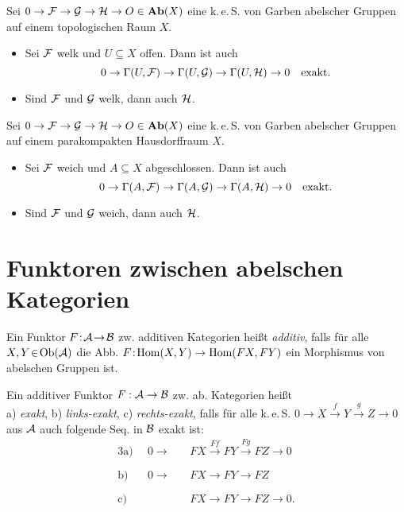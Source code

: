\documentclass{cheat-sheet}
\newcommand{\keS}{k.\,e.\,S.} %
\begin{document}
\begin{lem}
  Sei $0 \to \mathcal{F} \to \mathcal{G} \to \mathcal{H} \to O \in \mathbf{Ab}(X)$ eine \keS{} von Garben abelscher Gruppen auf einem topologischen Raum $X$.
  \begin{itemize}
    \item Sei $\mathcal{F}$ welk und $U \subseteq X$ offen. Dann ist auch
    \[
      0 \to \Gamma(U, \mathcal{F}) \to \Gamma(U, \mathcal{G}) \to \Gamma(U, \mathcal{H}) \to 0
      \quad \text{exakt.}
    \]
    \item Sind $\mathcal{F}$ und $\mathcal{G}$ welk, dann auch $\mathcal{H}$.
  \end{itemize}
\end{lem}

\begin{lem}
  Sei $0 \to \mathcal{F} \to \mathcal{G} \to \mathcal{H} \to O \in \mathbf{Ab}(X)$ eine \keS{} von Garben abelscher Gruppen auf einem parakompakten Hausdorffraum $X$.
  \begin{itemize}
    \item Sei $\mathcal{F}$ weich und $A \subseteq X$ abgeschlossen. Dann ist auch
    \[
      0 \to \Gamma(A, \mathcal{F}) \to \Gamma(A, \mathcal{G}) \to \Gamma(A, \mathcal{H}) \to 0
      \quad \text{exakt.}
    \]
    \item Sind $\mathcal{F}$ und $\mathcal{G}$ weich, dann auch $\mathcal{H}$.
  \end{itemize}
\end{lem}

\section{Funktoren zwischen abelschen Kategorien}

\begin{defn}
  Ein Funktor $F \!:\! \mathcal{A} \!\to\! \mathcal{B}$ zw. additiven Kategorien heißt \emph{additiv}, falls für alle $X, Y \!\in\! \operatorname{Ob}(\mathcal{A})$ die Abb. $F \!:\! \operatorname{Hom}(X, Y) \to \operatorname{Hom}(FX, FY)$ ein Morphismus von abelschen Gruppen ist.
\end{defn}


\begin{defn}
  Ein additiver Funktor $F : \mathcal{A} \to \mathcal{B}$ zw. ab. Kategorien heißt \\
  a) \emph{exakt}, b) \emph{links-exakt}, c) \emph{rechts-exakt}, falls für alle \keS{}
  $0 \to X \xrightarrow{f} Y \xrightarrow{g} Z \to 0$
  aus $\mathcal{A}$ auch folgende Seq. in $\mathcal{B}$ exakt ist:
  \begin{alignat*}{3}
    \text{a)} \enspace & 0 \to &&\, FX \xrightarrow{Ff} FY \xrightarrow{Fg} FZ \to 0 \\[-5pt]
    \text{b)} \enspace & 0 \to &&\, FX \xrightarrow{\phantom{Ff}} FY \xrightarrow{\phantom{Fg}} FZ \\[-5pt]
    \text{c)} \enspace & &&\, FX \xrightarrow{\phantom{Ff}} FY \xrightarrow{\phantom{Fg}} FZ \to 0.
  \end{alignat*}
\end{defn}
\end{document}

